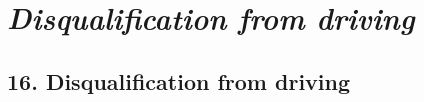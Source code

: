 \documentclass[12pt,a4paper]{article}
\begin{document}
%
%
%
%
%
%
%
%
%
%
%
%
%

\section{\itshape Disqualification from driving}

\subsection{16. Disqualification from driving}
\end{document}
